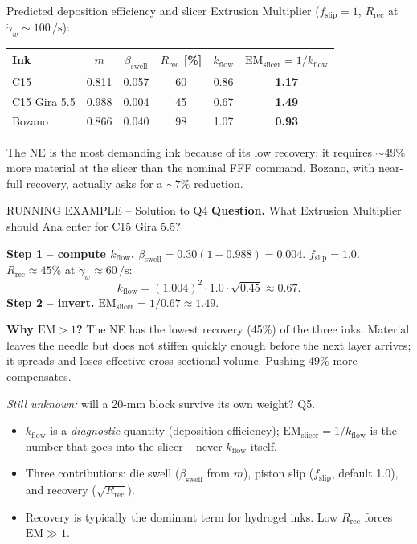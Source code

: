 \documentclass[11pt,a4paper]{article}
\newcommand{\gd}{\dot{\gamma}}
\begin{document}
\begin{examplebox}
Predicted deposition efficiency and slicer Extrusion Multiplier
($f_\mathrm{slip}=1$, $R_\mathrm{rec}$ at $\gd_w\sim 100\,\si{\per\s}$):

\medskip\centering
\begin{tabular}{lccccc}
\toprule
Ink & $m$ & $\beta_\mathrm{swell}$ & $R_\mathrm{rec}$ [\%]
  & $k_\mathrm{flow}$ & $\mathrm{EM}_\mathrm{slicer}=1/k_\mathrm{flow}$ \\
\midrule
C15           & 0.811 & 0.057 & 60 & 0.86 & \textbf{1.17} \\
C15 Gira 5.5  & 0.988 & 0.004 & 45 & 0.67 & \textbf{1.49} \\
Bozano        & 0.866 & 0.040 & 98 & 1.07 & \textbf{0.93} \\
\bottomrule
\end{tabular}

\medskip\flushleft
The NE is the most demanding ink because of its low recovery: it
requires $\sim 49\%$ more material at the slicer than the nominal
FFF command. Bozano, with near-full recovery, actually asks for a
$\sim 7\%$ reduction.
\end{examplebox}

\begin{runningbox}{RUNNING EXAMPLE -- Solution to Q4}
\textbf{Question.} What Extrusion Multiplier should Ana enter for
C15 Gira 5.5?

\medskip\textbf{Step 1 -- compute $k_\mathrm{flow}$.}
$\beta_\mathrm{swell}=0.30(1-0.988)=0.004$. $f_\mathrm{slip}=1.0$.
$R_\mathrm{rec}\approx 45\%$ at $\gd_w\approx 60\,\si{\per\s}$:
\[
k_\mathrm{flow} = (1.004)^2\cdot 1.0\cdot\sqrt{0.45} \approx 0.67.
\]
\textbf{Step 2 -- invert.} $\mathrm{EM}_\mathrm{slicer}=1/0.67\approx\mathbf{1.49}$.

\textbf{Why $\mathrm{EM}>1$?} The NE has the lowest recovery (45\%)
of the three inks. Material leaves the needle but does not stiffen
quickly enough before the next layer arrives; it spreads and loses
effective cross-sectional volume. Pushing 49\% more compensates.

\medskip\emph{Still unknown:} will a 20-mm block survive its own
weight? Q5.
\end{runningbox}

\begin{takeawaybox}
\begin{itemize}[leftmargin=1.4em,itemsep=2pt]
\item $k_\mathrm{flow}$ is a \emph{diagnostic} quantity (deposition
  efficiency); $\mathrm{EM}_\mathrm{slicer}=1/k_\mathrm{flow}$ is the
  number that goes into the slicer -- never $k_\mathrm{flow}$ itself.
\item Three contributions: die swell ($\beta_\mathrm{swell}$ from
  $m$), piston slip ($f_\mathrm{slip}$, default 1.0), and recovery
  ($\sqrt{R_\mathrm{rec}}$).
\item Recovery is typically the dominant term for hydrogel inks. Low
  $R_\mathrm{rec}$ forces $\mathrm{EM}\gg 1$.
\end{itemize}
\end{takeawaybox}
\end{document}

